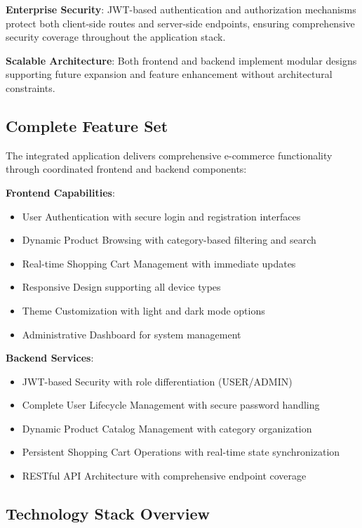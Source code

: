 \documentclass[12pt,a4paper]{article}
\begin{document}
\textbf{Enterprise Security}: JWT-based authentication and authorization mechanisms protect both client-side routes and server-side endpoints, ensuring comprehensive security coverage throughout the application stack.

\textbf{Scalable Architecture}: Both frontend and backend implement modular designs supporting future expansion and feature enhancement without architectural constraints.

\subsection{Complete Feature Set}

The integrated application delivers comprehensive e-commerce functionality through coordinated frontend and backend components:

\textbf{Frontend Capabilities}:
\begin{itemize}
    \item User Authentication with secure login and registration interfaces
    \item Dynamic Product Browsing with category-based filtering and search
    \item Real-time Shopping Cart Management with immediate updates
    \item Responsive Design supporting all device types
    \item Theme Customization with light and dark mode options
    \item Administrative Dashboard for system management
\end{itemize}

\textbf{Backend Services}:
\begin{itemize}
    \item JWT-based Security with role differentiation (USER/ADMIN)
    \item Complete User Lifecycle Management with secure password handling
    \item Dynamic Product Catalog Management with category organization
    \item Persistent Shopping Cart Operations with real-time state synchronization
    \item RESTful API Architecture with comprehensive endpoint coverage
\end{itemize}

\subsection{Technology Stack Overview}
\end{document}
